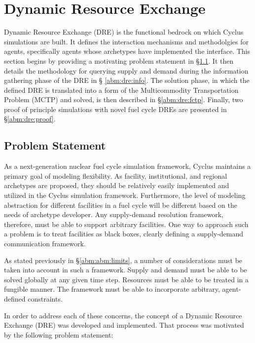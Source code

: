 \section{Dynamic Resource Exchange}\label{abm:dre}

Dynamic Resource Exchange (DRE) is the functional bedrock on which Cyclus
simulations are built. It defines the interaction mechanisms and methodolgies
for agents, specifically agents whose archetypes have implemented the
 interface. This section begins by providing a motivating problem
statement in \S \ref{abm:dre:prob}. It then details the methodology for querying
supply and demand during the information gathering phase of the DRE in \S
\ref{abm:dre:info}. The solution phase, in which the defined DRE is translated
into a form of the Multicommodity Transportation Problem (MCTP) and solved, is
then described in \S \ref{abm:dre:fctp}. Finally, two proof of principle
simulations with novel fuel cycle DREs are presented in \S \ref{abm:dre:proof}.

\subsection{Problem Statement}\label{abm:dre:prob}

As a next-generation nuclear fuel cycle simulation framework, Cyclus maintains a
primary goal of modeling flexibility. As facility, institutional, and regional
archetypes are proposed, they should be relatively easily implemented and
utilized in the Cyclus simulation framework. Furthermore, the level of modeling
abstraction for different facilities in a fuel cycle will be different based on
the needs of archetype developer. Any supply-demand resolution framework,
therefore, must be able to support arbitrary facilities. One way to approach
such a problem is to treat facilities as black boxes, clearly defining a
supply-demand communication framework.

As stated previously in \S \ref{abm:abm:limits}, a number of considerations must
be taken into account in such a framework. Supply and demand must be able to be
solved globally at any given time step. Resources must be able to be treated in
a fungible manner. The framework must be able to incorporate arbitrary,
agent-defined constraints.

In order to address each of these concerns, the concept of a Dynamic Resource
Exchange (DRE) was developed and implemented. That process was motivated by the
following problem statement:

